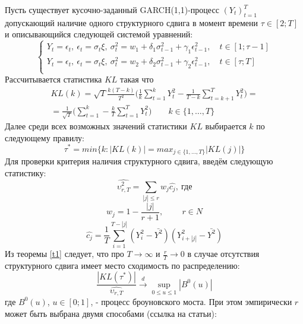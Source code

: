 \documentclass[a4paper,14pt,russian]{extarticle}
\begin{document}
	\par
	Пусть существует кусочно-заданный GARCH(1,1)-процесс $(Y_t)_{t=1}^T$ допускающий наличие одного структурного сдвига в момент времени $\tau \in \left[2; T\right]$ и описывающийся следующей системой уравнений:
	\begin{equation}
		\begin{cases}
			Y_t = \epsilon_t, \ \epsilon_t = \sigma_t \xi, \ \sigma_t^2 = w_1 + \delta_1 \sigma_{t-1}^2 + \gamma_1 \epsilon_{t-1}^2, \quad t \in \left[1;\tau-1\right] \\
			Y_t = \epsilon_t, \ \epsilon_t = \sigma_t \xi, \ \sigma_t^2 = w_2 + \delta_2 \sigma_{t-1}^2 + \gamma_2 \epsilon_{t-1}^2, \quad t \in \left[\tau;T\right] \\
		\end{cases}
	\end{equation}
	Рассчитывается статистика $KL$ такая что
	\begin{multline}
		KL(k) = \sqrt{T} \frac{k (T - k)}{T^2} \Bigg( \frac{1}{k} \sum_{t=1}^{k} Y_t^2 - \frac{1}{T-k} \sum_{t=k+1}^{T}Y_t^2\Bigg) =\\
		=\frac{1}{\sqrt{T}} \Bigg(\sum_{t=1}^{k} - \frac{k}{T} \sum_{t=1}^{T} Y_t^2\Bigg) \qquad k \in \{1, \dots, T\}
	\end{multline}
	Далее среди всех возможных значений статистики $KL$ выбирается $k$ по следующему правилу:
	\begin{equation}
		\tau^{*} = min\{k: |KL(k)| = max_{j \in \{1, \dots, T\}}|KL(j)| \}
	\end{equation}
	Для проверки критерия наличия структурного сдвига, введём следующую статистику:
	\begin{equation}
		\hat{\upsilon_{r,T}^2} = \sum_{|j| \leq r}^{}w_j\hat{c_j}, \ \text{где}
	\end{equation}
	\begin{equation}
		w_j = 1 - \frac{|j|}{r + 1}, \qquad \ r \in N
	\end{equation}
	\begin{equation}
		\hat{c_j} = \frac{1}{T} \sum_{i=1}^{T - |j|} (Y_i^2 - \bar{Y^2})(Y_{i + |j|}^2 - \bar{Y^2})
	\end{equation}
	Из теоремы \ref{t1} следует, что про $T \to \infty$ и $\frac{r}{T} \to 0$ в случае отсутствия структурного сдвига имеет место сходимость по распределению:
	\begin{equation}
		\frac{|KL(\tau^*)|}{\hat{\upsilon_{r,T}}} \xrightarrow[]{d} \sup_{0 \leq u \leq 1}|B^0(u)|
	\end{equation}
	где $B^0(u)$, $u \in \left[0; 1\right]$, - процесс броуновского моста. При этом эмпирически $r$ может быть выбрана двумя способами (ссылка на статьи):
\end{document}

